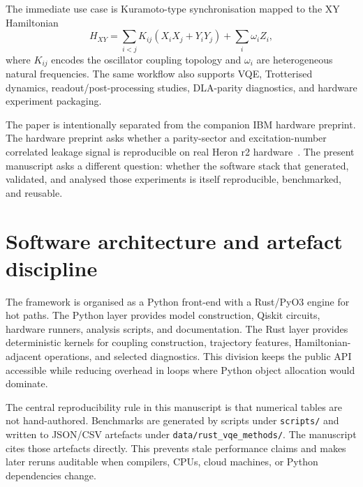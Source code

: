 \documentclass[preprint,aps,physrev,superscriptaddress,floatfix,longbibliography]{revtex4-2}
\begin{document}
The immediate use case is Kuramoto-type synchronisation mapped to the
XY Hamiltonian
%
\begin{equation}
  H_{XY} =
  \sum_{i<j} K_{ij}\left(X_i X_j + Y_i Y_j\right)
  + \sum_i \omega_i Z_i,
\end{equation}
%
where $K_{ij}$ encodes the oscillator coupling topology and $\omega_i$
are heterogeneous natural frequencies. The same workflow also supports
VQE, Trotterised dynamics, readout/post-processing studies, DLA-parity
diagnostics, and hardware experiment packaging.

The paper is intentionally separated from the companion IBM hardware
preprint. The hardware preprint asks whether a parity-sector and
excitation-number correlated leakage signal is reproducible on real Heron
r2 hardware~\cite{SotekDLA2026,SotekDLAData2026}. The present manuscript asks a different question: whether
the software stack that generated, validated, and analysed those
experiments is itself reproducible, benchmarked, and reusable.

\section{Software architecture and artefact discipline}

The framework is organised as a Python front-end with a Rust/PyO3 engine
for hot paths. The Python layer provides model construction, Qiskit
circuits, hardware runners, analysis scripts, and documentation. The Rust
layer provides deterministic kernels for coupling construction, trajectory
features, Hamiltonian-adjacent operations, and selected diagnostics. This
division keeps the public API accessible while reducing overhead in loops
where Python object allocation would dominate.

The central reproducibility rule in this manuscript is that numerical
tables are not hand-authored. Benchmarks are generated by scripts under
\texttt{scripts/} and written to JSON/CSV artefacts under
\texttt{data/rust\_vqe\_methods/}. The manuscript cites those artefacts
directly. This prevents stale performance claims and makes later
reruns auditable when compilers, CPUs, cloud machines, or Python
dependencies change.
\end{document}
